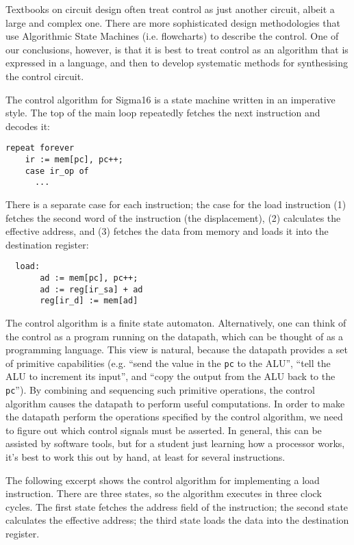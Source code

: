 \documentclass[submission,copyright,creativecommons]{eptcs}
\begin{document}
Textbooks on circuit design often treat control as just another
circuit, albeit a large and complex one.  There are more
sophisticated design methodologies that use Algorithmic State
Machines (i.e. flowcharts) to describe the control.  One of our
conclusions, however, is that it is best to treat control as an
algorithm that is expressed in a language, and then to develop
systematic methods for synthesising the control circuit.

The control algorithm for Sigma16 is a state machine written in an
imperative style.  The top of the main loop repeatedly fetches the
next instruction and decodes it:

{\footnotesize
\begin{verbatim}
repeat forever
    ir := mem[pc], pc++;
    case ir_op of
      ...
\end{verbatim}
}

There is a separate case for each instruction; the case for the
load instruction (1) fetches the second word of the instruction
(the displacement), (2) calculates the effective address, and (3)
fetches the data from memory and loads it into the destination
register:

{\footnotesize
\begin{verbatim}
  load:
       ad := mem[pc], pc++;
       ad := reg[ir_sa] + ad
       reg[ir_d] := mem[ad]
\end{verbatim}
}

The control algorithm is a finite state automaton.  Alternatively, one
can think of the control as a program running on the datapath, which
can be thought of as a programming language.  This view is natural,
because the datapath provides a set of primitive capabilities (e.g.
``send the value in the \texttt{pc} to the ALU'', ``tell the ALU to
increment its input'', and ``copy the output from the ALU back to the
\texttt{pc}'').  By combining and sequencing such primitive
operations, the control algorithm causes the datapath to perform
useful computations.  In order to make the datapath perform the
operations specified by the control algorithm, we need to figure out
which control signals must be asserted.  In general, this can be
assisted by software tools, but for a student just learning how a
processor works, it's best to work this out by hand, at least for
several instructions.

The following excerpt shows the control algorithm for implementing a
load instruction.  There are three states, so the algorithm executes
in three clock cycles.  The first state fetches the address field of
the instruction; the second state calculates the effective address;
the third state loads the data into the destination register.
\end{document}
